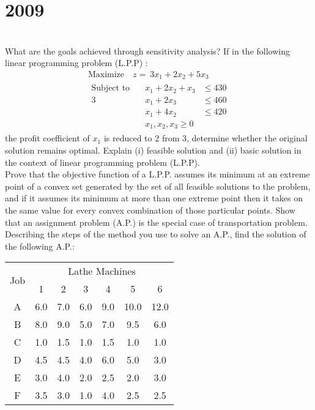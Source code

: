 \section*{2009}
\vspace{-.5cm}
\hrulefill \smallskip\\
 What are the goals achieved through sensitivity analysis? If in the following linear programming problem (L.P.P) :
\begin{gather*}
    \text{Maximize} \quad z = \:3x_1 + 2x_2 + 5x_3 \\
    \begin{aligned}
        \text{Subject to} \quad & x_1 + 2x_2 + x_3 &\leq 430 \\
         3&x_1 + 2x_3 & \leq 460 \\
        & x_1 + 4x_2 &\leq 420 \\
        &x_1,x_2, x_3 \geq 0
    \end{aligned}
\end{gather*}
the profit coefficient of $x_1$ is reduced to 2 from 3, determine whether the original solution remains optimal.
\myline
{} Explain (i) feasible solution and (ii) basic solution in the context of linear programming problem (L.P.P).\\
Prove that the objective function of a L.P.P. assumes its minimum at an extreme point of a convex set generated by the set of all feasible solutions to the problem, and if it assumes its minimum at more than one extreme point then it takes on the same value for every convex combination of those particular points.
\myline
{} Show that an assignment problem (A.P.) is the special case of transportation problem.\\ Describing the steps of the method you use to solve an A.P., find the solution of the following A.P.:
\begin{center}
    \begin{tabular}{*{7}{c}}\hline
    \multirow{2}{*}{Job}& \multicolumn{6}{c}{Lathe Machines} \\ \cline{2-7}
    & 1 & 2 & 3 & 4 & 5 & 6 \\ \hline
    A & 6.0 & 7.0 & 6.0 & 9.0 & 10.0 & 12.0 \\
    B & 8.0 & 9.0 & 5.0 & 7.0 & 9.5 & 6.0 \\
    C & 1.0 & 1.5 & 1.0 & 1.5 & 1.0 & 1.0 \\
    D & 4.5 & 4.5 & 4.0 & 6.0 & 5.0 & 3.0 \\
    E & 3.0 & 4.0 & 2.0 & 2.5 & 2.0 & 3.0 \\
    F & 3.5 & 3.0 & 1.0 & 4.0 & 2.5 & 2.5 \\ \hline
    \end{tabular}
\end{center}

